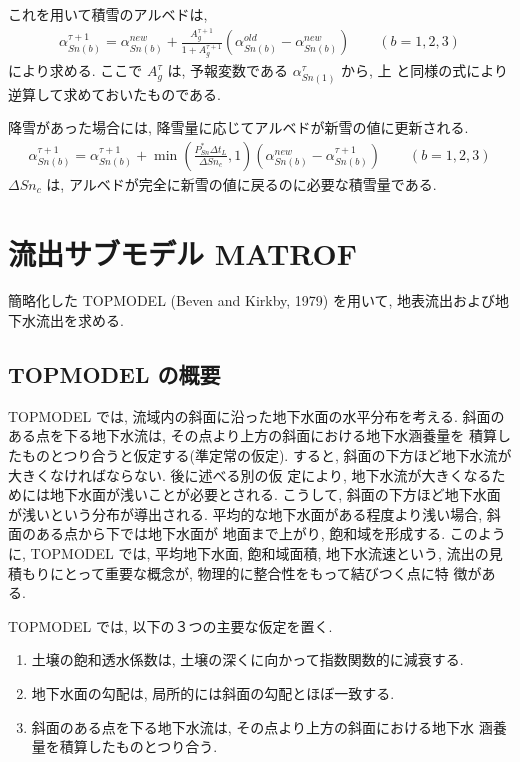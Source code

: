 これを用いて積雪のアルベドは, 
\begin{eqnarray}
 \alpha_{Sn(b)}^{\tau+1} = \alpha_{Sn(b)}^{new} + \frac{A_g^{\tau+1}}{1+A_g^{\tau+1}} (\alpha_{Sn(b)}^{old} - \alpha_{Sn(b)}^{new}) \qquad (b=1,2,3)
\end{eqnarray}
により求める. 
ここで $A_g^{\tau}$ は, 予報変数である $\alpha_{Sn(1)}^{\tau}$ から, 上
と同様の式により逆算して求めておいたものである. 

降雪があった場合には, 降雪量に応じてアルベドが新雪の値に更新される. 
\begin{eqnarray}
 \alpha_{Sn(b)}^{\tau+1} = \alpha_{Sn(b)}^{\tau+1} 
+ \min\left( \frac{P_{Sn}^* \Delta t_L}{\Delta{Sn_c}}, 1 \right) (\alpha_{Sn(b)}^{new} - \alpha_{Sn(b)}^{\tau+1}) \qquad (b=1,2,3)
\end{eqnarray}
$\Delta {Sn_c}$ は, アルベドが完全に新雪の値に戻るのに必要な積雪量である. 

\section{流出サブモデル MATROF}

簡略化した TOPMODEL (Beven and Kirkby, 1979) を用いて, 地表流出および地
下水流出を求める. 

\subsection{TOPMODEL の概要}

TOPMODEL では, 流域内の斜面に沿った地下水面の水平分布を考える. 
斜面のある点を下る地下水流は, その点より上方の斜面における地下水涵養量を
積算したものとつり合うと仮定する(準定常の仮定). 
すると, 斜面の下方ほど地下水流が大きくなければならない. 後に述べる別の仮
定により, 地下水流が大きくなるためには地下水面が浅いことが必要とされる. 
こうして, 斜面の下方ほど地下水面が浅いという分布が導出される. 
平均的な地下水面がある程度より浅い場合, 斜面のある点から下では地下水面が
地面まで上がり, 飽和域を形成する. 
このように, TOPMODEL では, 平均地下水面, 飽和域面積, 地下水流速という,
流出の見積もりにとって重要な概念が, 物理的に整合性をもって結びつく点に特
徴がある. 

TOPMODEL では, 以下の３つの主要な仮定を置く. 
\begin{enumerate}
  \item 土壌の飽和透水係数は, 土壌の深くに向かって指数関数的に減衰する. 
  \item 地下水面の勾配は, 局所的には斜面の勾配とほぼ一致する. 
  \item 斜面のある点を下る地下水流は, その点より上方の斜面における地下水
	涵養量を積算したものとつり合う. 
\end{enumerate}

